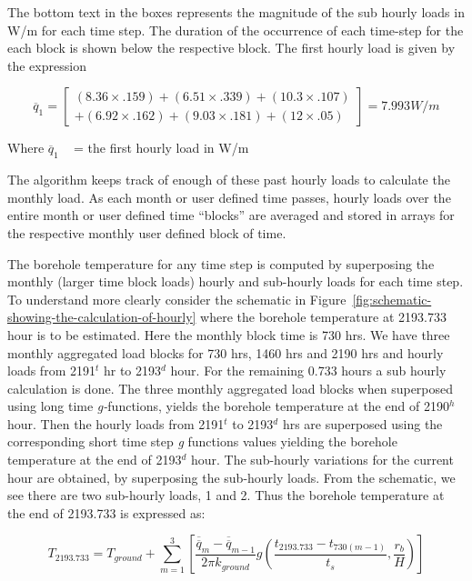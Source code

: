 The bottom text in the boxes represents the magnitude of the sub hourly loads in W/m for each time step. The duration of the occurrence of each time-step for the each block is shown below the respective block. The first hourly load is given by the expression

\begin{equation}
{\overline q_1} = \left[ \begin{array}{l}\left( {8.36 \times .159} \right) + \left( {6.51 \times .339} \right) + \left( {10.3 \times .107} \right)\\ + \left( {6.92 \times .162} \right) + \left( {9.03 \times .181} \right) + \left( {12 \times .05} \right)\end{array} \right] = 7.993W/m
\end{equation}

Where \({\overline q_1}\) ~ = the first hourly load in W/m

The algorithm keeps track of enough of these past hourly loads to calculate the monthly load. As each month or user defined time passes, hourly loads over the entire month or user defined time ``blocks'' are averaged and stored in arrays for the respective monthly user defined block of time.

The borehole temperature for any time step is computed by superposing the monthly (larger time block loads) hourly and sub-hourly loads for each time step. To understand more clearly consider the schematic in Figure~\ref{fig:schematic-showing-the-calculation-of-hourly} where the borehole temperature at 2193.733 hour is to be estimated. Here the monthly block time is 730 hrs. We have three monthly aggregated load blocks for 730 hrs, 1460 hrs and 2190 hrs and hourly loads from 2191\(^{t}\) hr to 2193\(^{d}\) hour. For the remaining 0.733 hours a sub hourly calculation is done. The three monthly aggregated load blocks when superposed using long time \emph{g-}functions, yields the borehole temperature at the end of 2190\(^{h}\) hour. Then the hourly loads from 2191\(^{t}\) to 2193\(^{d}\) hrs are superposed using the corresponding short time step \emph{g} functions values yielding the borehole temperature at the end of 2193\(^{d}\) hour. The sub-hourly variations for the current hour are obtained, by superposing the sub-hourly loads. From the schematic, we see there are two sub-hourly loads, 1 and 2. Thus the borehole temperature at the end of 2193.733 is expressed as:

\begin{equation}
{T_{2193.733}} = {T_{ground}} + \sum\limits_{m = 1}^3 {\left[ {\frac{{{{\overline{\overline q} }_m} - {{\overline{\overline q} }_{m - 1}}}}{{2\pi {k_{ground}}}}g\left( {\frac{{{t_{2193.733}} - {t_{730(m - 1)}}}}{{{t_s}}},\frac{{{r_b}}}{H}} \right)} \right]}
\end{equation}

